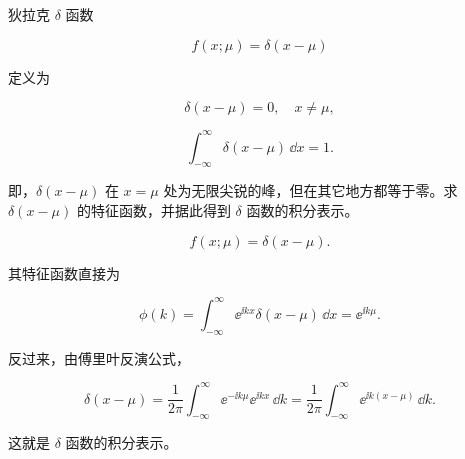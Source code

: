 \begin{question}
狄拉克 \(\delta\) 函数

\[
f(x;\mu)=\delta(x-\mu)
\]

定义为

\[
\delta(x-\mu)=0,\quad x\ne\mu,
\]

\[
\int_{-\infty}^{\infty}\delta(x-\mu)\,\dd{x}=1.
\]

即，\(\delta(x-\mu)\) 在 \(x=\mu\)
处为无限尖锐的峰，但在其它地方都等于零。求 \(\delta(x-\mu)\)
的特征函数，并据此得到 \(\delta\) 函数的积分表示。
\begin{solution}
\[
f(x;\mu)=\delta(x-\mu).
\]

其特征函数直接为

\[
\phi(k)=\int_{-\infty}^{\infty} \ee^{\ii kx}\delta(x-\mu)\,\dd{x}=\ee^{\ii k\mu}.
\]

反过来，由傅里叶反演公式，

\[
\delta(x-\mu)=\frac{1}{2\pi}\int_{-\infty}^{\infty} \ee^{-\ii k\mu}\ee^{\ii kx}\,\dd{k}
=\frac1{2\pi}\int_{-\infty}^{\infty} \ee^{\ii k(x-\mu)}\,\dd{k} .
\]

这就是 \(\delta\) 函数的积分表示。
\end{solution}
\end{question}

